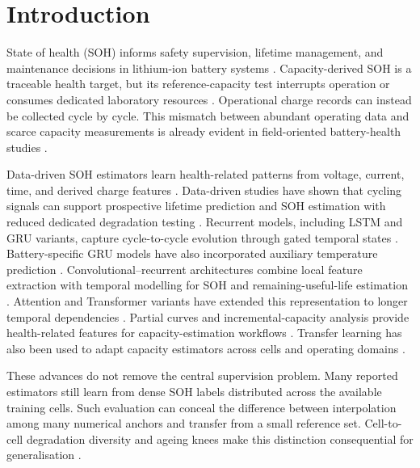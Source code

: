 \documentclass[pdflatex,sn-mathphys-num]{sn-jnl}
\begin{document}
\section{Introduction}
\label{sec:introduction}

State of health (SOH) informs safety supervision, lifetime management, and maintenance decisions in lithium-ion battery systems \cite{berecibar2016critical,vignesh2024state}. Capacity-derived SOH is a traceable health target, but its reference-capacity test interrupts operation or consumes dedicated laboratory resources \cite{che2023health,birkl2017degradation}. Operational charge records can instead be collected cycle by cycle. This mismatch between abundant operating data and scarce capacity measurements is already evident in field-oriented battery-health studies \cite{hadzalic2025field}.

Data-driven SOH estimators learn health-related patterns from voltage, current, time, and derived charge features \cite{roman2021machine,ng2020predicting}. Data-driven studies have shown that cycling signals can support prospective lifetime prediction and SOH estimation with reduced dedicated degradation testing \cite{severson2019data,lu2023deep}. Recurrent models, including LSTM and GRU variants, capture cycle-to-cycle evolution through gated temporal states \cite{hochreiter1997long,liu2023online}. Battery-specific GRU models have also incorporated auxiliary temperature prediction \cite{chen2022state}. Convolutional--recurrent architectures combine local feature extraction with temporal modelling for SOH and remaining-useful-life estimation \cite{zhu2022attention}. Attention and Transformer variants have extended this representation to longer temporal dependencies \cite{zhao2023state,fan2023online}. Partial curves and incremental-capacity analysis provide health-related features for capacity-estimation workflows \cite{lyu2021partial,dubarry2022best}. Transfer learning has also been used to adapt capacity estimators across cells and operating domains \cite{ma2022real,zhou2022transfer}.

These advances do not remove the central supervision problem. Many reported estimators still learn from dense SOH labels distributed across the available training cells. Such evaluation can conceal the difference between interpolation among many numerical anchors and transfer from a small reference set. Cell-to-cell degradation diversity and ageing knees make this distinction consequential for generalisation \cite{li2022towards,attia2022knees}.
\end{document}
